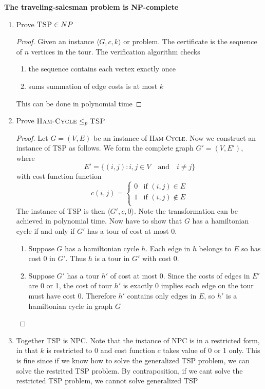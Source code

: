 \documentclass[11pt]{article}
\begin{document}
\begin{theorem*}
    \textbf{The traveling-salesman problem is NP-complete}
    \begin{enumerate}
        \item Prove $\textsc{TSP} \in NP$ 
        \begin{proof}
            Given an instance $\langle G, c, k \rangle$ or problem. The certificate is the sequence of $n$ vertices in the tour. The verification algorithm checks 
            \begin{enumerate}
                \item the sequence contains each vertex exactly once 
                \item sums summation of edge costs is at most $k$ 
            \end{enumerate}
            This can be done in polynomial time 
        \end{proof}
        \item Prove $\textsc{Ham-Cycle} \leq_p \textsc{TSP}$ 
        \begin{proof}
            Let $G = (V,E)$ be an instance of \textsc{Ham-Cycle}. Now we construct an instance of \textsc{TSP} as follows. We form the complete graph $G' = (V,E')$, where 
            \[
                E' = \{(i,j): i,j \in V \quad \text{and} \quad i\neq j \}
            \]
            with cost function function 
            \[
                c(i,j) = 
                \begin{cases}
                    0 & \text{if } (i,j)\in E\\
                    1 & \text{if } (i,j)\not\in E\\
                \end{cases}
            \]
            The instance of TSP is then $\langle G', c, 0 \rangle$. Note the transformation can be achieved in polynomial time. Now have to show that $G$ has a hamiltonian cycle if and only if $G'$ has a tour of cost at most 0. 
            \begin{enumerate}
                \item Suppose $G$ has a hamiltonian cycle $h$. Each edge in $h$ belongs to $E$ so has cost 0 in $G'$. Thus $h$ is a tour in $G'$ with cost 0. 
                \item Suppose $G'$ has a tour $h'$ of cost at most 0. Since the costs of edges in $E'$ are 0 or 1, the cost of tour $h'$ is exactly 0 implies each edge on the tour must have cost 0. Therefore $h'$ contains only edges in $E$, so $h'$ is a hamiltonian cycle in graph $G$
            \end{enumerate}
        \end{proof}
        \item Together TSP is NPC. Note that the instance of NPC is in a restricted form, in that $k$ is restricted to 0 and cost function $c$ takes value of 0 or 1 only. This is fine since if we know how to solve the generalized TSP problem, we can solve the restrited TSP problem. By contraposition, if we cant solve the restricted TSP problem, we cannot solve generalized TSP
    \end{enumerate}
\end{theorem*}
\end{document}
